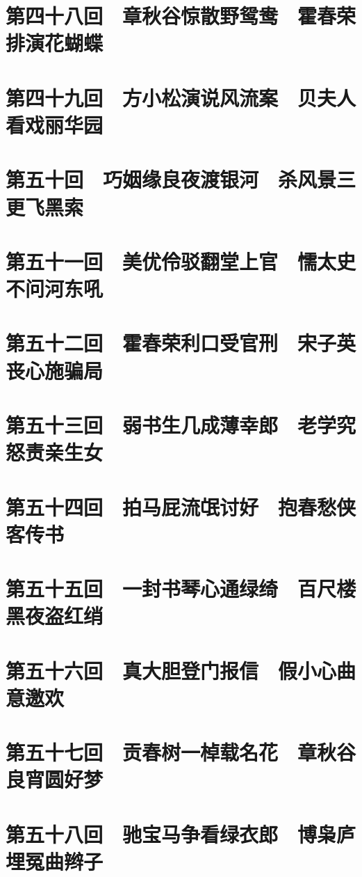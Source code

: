 \documentclass[12pt,UTF8]{ctexbook}
\begin{document}
\chapter{第四十八回　章秋谷惊散野鸳鸯　霍春荣排演花蝴蝶}

\chapter{第四十九回　方小松演说风流案　贝夫人看戏丽华园}

\chapter{第五十回　巧姻缘良夜渡银河　杀风景三更飞黑索}

\chapter{第五十一回　美优伶驳翻堂上官　懦太史不问河东吼}

\chapter{第五十二回　霍春荣利口受官刑　宋子英丧心施骗局}

\chapter{第五十三回　弱书生几成薄幸郎　老学究怒责亲生女}

\chapter{第五十四回　拍马屁流氓讨好　抱春愁侠客传书}

\chapter{第五十五回　一封书琴心通绿绮　百尺楼黑夜盗红绡}

\chapter{第五十六回　真大胆登门报信　假小心曲意邀欢}

\chapter{第五十七回　贡春树一棹载名花　章秋谷良宵圆好梦}

\chapter{第五十八回　驰宝马争看绿衣郎　博枭庐埋冤曲辫子}
\end{document}
